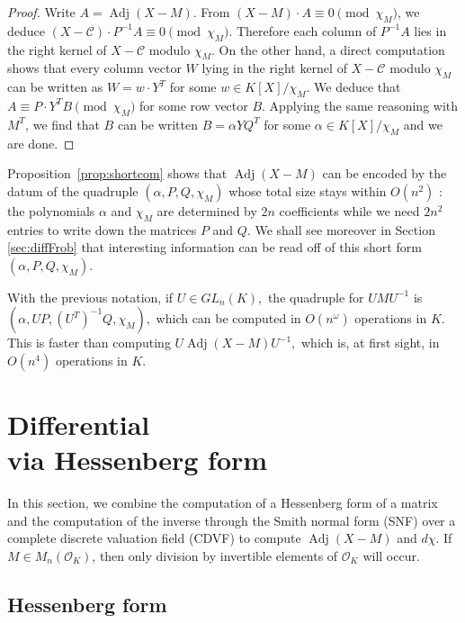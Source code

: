 \documentclass{sig-alternate-05-2015}
\DeclareMathOperator{\adj}{Adj}
\newcommand{\OK}{\mathcal{O}_K}
\begin{document}
\begin{proof}
Write $A = \adj(X{-}M)$. From $(X{-}M) \cdot A \equiv 0 
\pmod{\chi_M}$, we deduce $(X{-}\mathscr{C}) \cdot P^{-1} A \equiv 0 \pmod{\chi_M}$. 
Therefore each column of $P^{-1} A$ lies in the right kernel of $X{-}\mathscr{C}$
modulo $\chi_M$. On the other hand, a direct computation shows that
every column vector $W$ lying in the right kernel of $X{-}\mathscr{C}$ modulo 
$\chi_M$ can be written as $W = w \cdot Y^T$ for some $w \in 
K[X]/\chi_M$. We deduce that $A \equiv P \cdot Y^T B \pmod{\chi_M}$
for some row vector $B$.
Applying the same reasoning with $M^T$, we find that $B$ can be
written $B = \alpha Y Q^T$ for some $\alpha \in K[X]/\chi_M$ and
we are done.
\end{proof}

Proposition~\ref{prop:shortcom} shows that $\adj(X{-}M)$ can be encoded 
by the datum of the quadruple $(\alpha, P, Q, \chi_M)$ whose total size 
stays within $O(n^2)$ : the polynomials $\alpha$ and $\chi_M$ are 
determined by $2n$ coefficients while we need $2n^2$ entries to 
write down the matrices $P$ and $Q$. 
We shall see moreover in Section \ref{sec:diffFrob} that interesting
information can be read off of this short form $(\alpha, P, Q, 
\chi_M)$.

\begin{rem}
With the previous notation, if $U \in GL_n(K),$
the quadruple for 
$UMU^{-1}$ is
$(\alpha, UP, (U^T)^{-1}Q, \chi_M),$
which can be computed in $O(n^\omega)$ operations in $K.$
This is faster than computing $U \adj(X-M) U^{-1},$
which is, at first sight, in $O(n^4)$ operations in $K.$
\end{rem}

\section{Differential\\via Hessenberg form}
\label{sec:diffHess}

In this section, we combine the computation of a Hessenberg form
of a matrix and the computation of the inverse through the Smith normal form (SNF)
over a complete discrete valuation field (CDVF)
to compute $\adj(X-M)$ and $d \chi$.
If $M \in M_n(\OK)$, then only division by invertible
elements of $\OK$ will occur.

\subsection{Hessenberg form}
\end{document}
